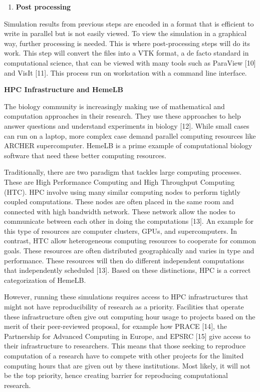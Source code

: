 \documentclass[]{article}
\providecommand{\tightlist}{%
  \setlength{\itemsep}{0pt}\setlength{\parskip}{0pt}}
\begin{document}
\begin{enumerate}
\def\labelenumi{\arabic{enumi}.}
\setcounter{enumi}{4}
\tightlist
\item
  \textbf{Post processing}
\end{enumerate}

Simulation results from previous steps are encoded in a format that is
efficient to write in parallel but is not easily viewed. To view the
simulation in a graphical way, further processing is needed. This is
where post-processing steps will do its work. This step will convert the
files into a VTK format, a de facto standard in computational science,
that can be viewed with many tools such as ParaView {[}10{]} and VisIt
{[}11{]}. This process run on workstation with a command line interface.

\textbf{HPC Infrastructure and HemeLB}

The biology community is increasingly making use of mathematical and
computation approaches in their research. They use these approaches to
help answer questions and understand experiments in biology {[}12{]}.
While small cases can run on a laptop, more complex case demand parallel
computing resources like ARCHER supercomputer. HemeLB is a prime example
of computational biology software that need these better computing
resources.

Traditionally, there are two paradigm that tackles large computing
processes. These are High Performance Computing and High Throughput
Computing (HTC). HPC involve using many similar computing nodes to
perform tightly coupled computations. These nodes are often placed in
the same room and connected with high bandwidth network. These network
allow the nodes to communicate between each other in doing the
computations {[}13{]}. An example for this type of resources are
computer clusters, GPUs, and supercomputers. In contrast, HTC allow
heterogeneous computing resources to cooperate for common goals. These
resources are often distributed geographically and varies in type and
performance. These resources will then do different independent
computations that independently scheduled {[}13{]}. Based on these
distinctions, HPC is a correct categorization of HemeLB.

However, running these simulations requires access to HPC
infrastructures that might not have reproducibility of research as a
priority. Facilities that operate these infrastructure often give out
computing hour usage to projects based on the merit of their
peer-reviewed proposal, for example how PRACE {[}14{]}, the Partnership
for Advanced Computing in Europe, and EPSRC {[}15{]} give access to
their infrastructure to researchers. This means that those seeking to
reproduce computation of a research have to compete with other projects
for the limited computing hours that are given out by these
institutions. Most likely, it will not be the top priority, hence
creating barrier for reproducing computational research.
\end{document}
